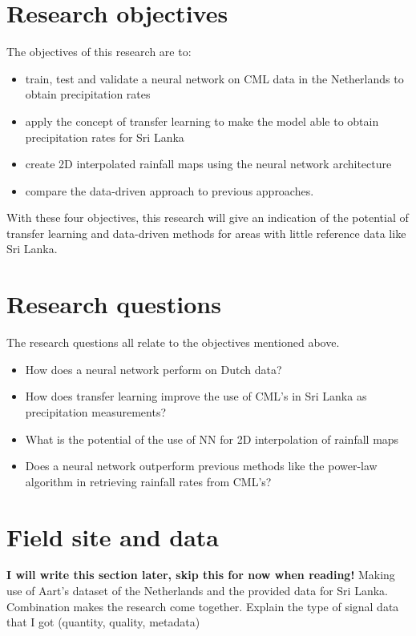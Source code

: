 \documentclass[twocolumn, 10pt, a4paper]{article}
\begin{document}
	
	\section{Research objectives}
	
	The objectives of this research are to:
	\begin{itemize}
		\item train, test and validate a neural network on CML data in the Netherlands to obtain precipitation rates
		\item apply the concept of transfer learning to make the model able to obtain precipitation rates for Sri Lanka
		\item create 2D interpolated rainfall maps using the neural network architecture
		\item compare the data-driven approach to previous approaches.
	\end{itemize} 
	With these four objectives, this research will give an indication of the potential of transfer learning and data-driven methods for areas with little reference data like Sri Lanka. 
	 
	
	\section{Research questions}
	The research questions all relate to the objectives mentioned above. 
	\begin{itemize}
		\item How does a neural network perform on Dutch data?
		\item How does transfer learning improve the use of CML's in Sri Lanka as precipitation measurements?
		\item What is the potential of the use of NN for 2D interpolation of rainfall maps
		\item Does a neural network outperform previous methods like the power-law algorithm in retrieving rainfall rates from CML's?
	\end{itemize}
	
	
	\section{Field site and data}
	\textbf{I will write this section later, skip this for now when reading!}
	Making use of Aart's dataset of the Netherlands and the provided data for Sri Lanka. Combination makes the research come together. Explain the type of signal data that I got (quantity, quality, metadata)
	
\end{document}
